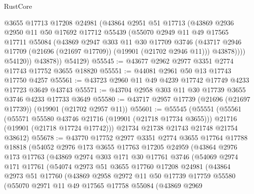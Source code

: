 \begin{lexlean}{RustCore}
\begin{coremodule}
              @3655
              @17713
              @17208
              @24981
              (@43864
                @2951
                @51
                @17713
                (@43869
                  @2936
                  @2950
                  @11
                  @50
                  @17692
                  @17712
                  @55439
                  (@55070
                    @2949
                    @11
                    @49
                    @17565
                    @17711
                    @55084
                    (@43869
                      @2947
                      @303
                      @11
                      @30
                      @17709
                      @3746
                      (@43717 @2946 @17709 (@21696 (@21697 @17709)) (@19901 (@21702 @2946 @11)))
                      @43878))))
              @54120))
          @43878))
      @54129)
@55545 := @43677 @2962 @2977 @3351 @2774 @17743 @17752 @3655 @18820
@55551 := @44081 @2961 @50 @13 @17743 @17750 @4257
@55561 := @43723 @2960 @11 @49 @4239 @17742 @17749 @4233 @17723 @3649 @43743
@55571 := @43704 @2958 @303 @11 @30 @17739 @3655 @3746 @4233 @17733 @3649
@55580 := @43717 @2957 @17739 (@21696 (@21697 @17739)) (@19901 (@21702 @2957 @11))
@55601 := @55545
    (@55551
      (@55561
        (@55571 @55580 @43746 @21716 (@19901 (@21718 @17734 @3655)))
        @21716
        (@19901 (@21718 @17724 @17742)))
      @21734
      @21738
      @21743
      @21748
      @21754
      @38612)
@55678 := @43770
    @17752
    @2977
    @3351
    @2774
    @3655
    @17764
    @17788
    @18818
    (@54052
      @2976
      @173
      @3655
      @17763
      @17205
      @24959
      (@43864
        @2976
        @173
        @17763
        (@43869
          @2974
          @303
          @171
          @30
          @17761
          @3746
          (@54069
            @2974
            @171
            @17761
            (@54074
              @2973
              @51
              @3655
              @17760
              @17208
              @24981
              (@43864
                @2973
                @51
                @17760
                (@43869
                  @2958
                  @2972
                  @11
                  @50
                  @17739
                  @17759
                  @55580
                  (@55070
                    @2971
                    @11
                    @49
                    @17565
                    @17758
                    @55084
                    (@43869
                      @2969

\end{coremodule}
\end{lexlean}
